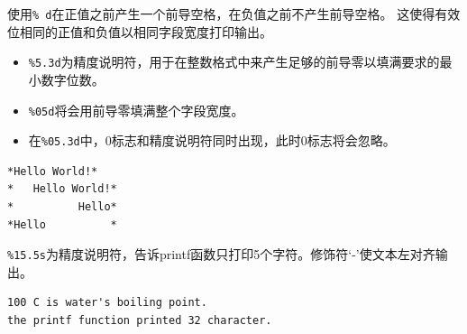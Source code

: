 \begin{frame}[fragile] 
 使用\lstinline|% d|在正值之前产生一个前导空格，在负值之前不产生前导空格。
这使得有效位相同的正值和负值以相同字段宽度打印输出。
\end{frame}

\begin{frame}[fragile] 
\begin{itemize}
\item \lstinline|%5.3d|为精度说明符，用于在整数格式中来产生足够的前导零以填满要求的最小数字位数。\\[0.1in]
\item \lstinline|%05d|将会用前导零填满整个字段宽度。\\[0.1in]
\item 在\lstinline|%05.3d|中，0标志和精度说明符同时出现，此时0标志将会忽略。
\end{itemize}
\end{frame}

\begin{frame}[fragile]
    
\end{frame}

\begin{frame}[fragile]
\begin{lstlisting}[showspaces=true,backgroundcolor=\color{red!20}]
*Hello World!*
*   Hello World!*
*          Hello*
*Hello          *
\end{lstlisting}
\end{frame}

\begin{frame}[fragile]
\lstinline|%15.5s|为精度说明符，告诉printf函数只打印5个字符。修饰符‘-’使文本左对齐输出。
\end{frame}

\begin{frame}[fragile]

\end{frame}

\begin{frame}[fragile]
\begin{lstlisting}[backgroundcolor=\color{red!20}]
100 C is water's boiling point.
the printf function printed 32 character.
\end{lstlisting}
\end{frame}

